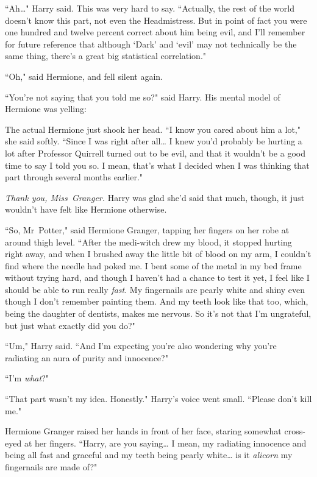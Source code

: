 ``Ah{\ldots}" Harry said. This was very hard to say. ``Actually, the rest of the world doesn't know this part, not even the Headmistress. But in point of fact you were one hundred and twelve percent correct about him being evil, and I'll remember for future reference that although `Dark' and `evil' may not technically be the same thing, there's a great big statistical correlation."

``Oh," said Hermione, and fell silent again.

``You're not saying that you told me so?" said Harry. His mental model of Hermione was yelling: 

The actual Hermione just shook her head. ``I know you cared about him a lot," she said softly. ``Since I was right after all{\ldots} I knew you'd probably be hurting a lot after Professor Quirrell turned out to be evil, and that it wouldn't be a good time to say I told you so. I mean, that's what I decided when I was thinking that part through several months earlier."

\emph{Thank you, Miss~Granger.} Harry was glad she'd said that much, though, it just wouldn't have felt like Hermione otherwise.

``So, Mr~Potter," said Hermione Granger, tapping her fingers on her robe at around thigh level. ``After the medi-witch drew my blood, it stopped hurting right away, and when I brushed away the little bit of blood on my arm, I couldn't find where the needle had poked me. I bent some of the metal in my bed frame without trying hard, and though I haven't had a chance to test it yet, I feel like I should be able to run really \emph{fast}. My fingernails are pearly white and shiny even though I don't remember painting them. And my teeth look like that too, which, being the daughter of dentists, makes me nervous. So it's not that I'm ungrateful, but just what exactly did you do?"

``Um," Harry said. ``And I'm expecting you're also wondering why you're radiating an aura of purity and innocence?"

``I'm \emph{what}?"

``That part wasn't my idea. Honestly." Harry's voice went small. ``Please don't kill me."

Hermione Granger raised her hands in front of her face, staring somewhat cross-eyed at her fingers. ``Harry, are you saying{\ldots} I mean, my radiating innocence and being all fast and graceful and my teeth being pearly white{\ldots} is it \emph{alicorn} my fingernails are made of?"

